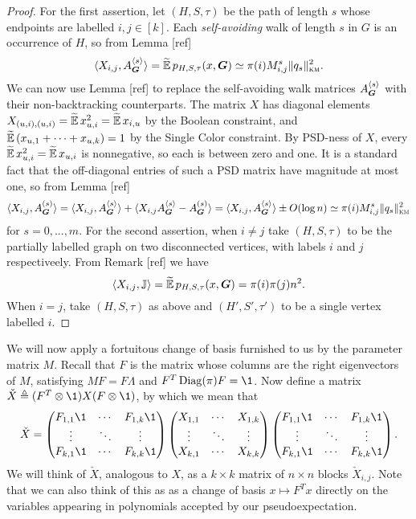 \begin{proof}
    For the first assertion, let $(H,S,\tau)$ be the path of length $s$ whose endpoints are labelled $i,j\in[k]$. Each \textit{self-avoiding} walk of length $s$ in $G$ is an occurrence of $H$, so from Lemma [ref]
    $$
        \langle X_{i,j},A^{\langle s \rangle}_{\boldsymbol{G}}\rangle = \widetilde{\operatorname*{\mathbb{E}}}\, p_{H,S,\tau}(x,\boldsymbol{G}) \simeq \pi(i)M_{i,j}^s \|q_s\|^2_{\textsc{km}}.
    $$
    We can now use Lemma [ref] to replace the self-avoiding walk matrices $A^{\langle s \rangle}_{\boldsymbol{G}}$ with their non-backtracking counterparts. The matrix $X$ has diagonal elements $X_{(u,i),(u,i)} = \widetilde{\operatorname*{\mathbb{E}}}\, x_{u,i}^2 = \widetilde{\operatorname*{\mathbb{E}}}\, x_{i,u}$ by the Boolean constraint, and $\widetilde{\operatorname*{\mathbb{E}}}\, (x_{u,1} + \cdots + x_{u,k}) = 1$ by the Single Color constraint. By PSD-ness of $X$, every $\widetilde{\operatorname*{\mathbb{E}}}\, x_{u,i}^2 = \widetilde{\operatorname*{\mathbb{E}}}\, x_{u,i}$ is nonnegative, so each is between zero and one. It is a standard fact that the off-diagonal entries of such a PSD matrix have magnitude at most one, so from Lemma [ref]
    $$
        \langle X_{i,j}, A^{(s)}_{\boldsymbol{G}} \rangle = \langle X_{i,j}, A^{\langle s \rangle}_{\boldsymbol{G}} \rangle + \langle X_{i,j} A^{\langle s \rangle}_{\boldsymbol{G}} - A^{(s)}_{\boldsymbol{G}}\rangle = \langle X_{i,j}, A^{\langle s \rangle}_{\boldsymbol{G}} \rangle \pm O(\log n) \simeq \pi(i)M^s_{i,j} \|q_s\|^2_{\textsc{km}}
    $$
    for $s = 0,...,m$. For the second assertion, when $i\neq j$ take $(H,S,\tau)$ to be the partially labelled graph on two disconnected vertices, with labels $i$ and $j$ respectiveely. From Remark [ref] we have
    $$
        \langle X_{i,j},\mathbb{J} \rangle = \widetilde{\operatorname*{\mathbb{E}}}\, p_{H,S,\tau}(x,\boldsymbol{G}) = \pi(i)\pi(j)n^2.
    $$
    When $i=j$, take $(H,S,\tau)$ as above and $(H',S',\tau')$ to be a single vertex labelled $i$.
\end{proof}

We will now apply a fortuitous change of basis furnished to us by the parameter matrix $M$. Recall that $F$ is the matrix whose columns are the right eigenvectors of $M$, satisfying $MF = F\Lambda$ and $F^T\Diag(\pi)F = \1$. Now define a matrix $\check X \triangleq (F^T \otimes \1) X (F\otimes \1)$, by which we mean that 
$$
    \check X = \begin{pmatrix} F_{1,1}\1 & \cdots & F_{1,k}\1 \\
    \vdots & \ddots & \vdots \\
    F_{k,1}\1 & \cdots & F_{k,k}\1 
    \end{pmatrix} 
    \begin{pmatrix} X_{1,1} & \cdots & X_{1,k} \\
    \vdots & \ddots & \vdots \\
    X_{k,1} & \cdots & X_{k,k} 
    \end{pmatrix}
    \begin{pmatrix} F_{1,1}\1 & \cdots & F_{1,k}\1 \\
    \vdots & \ddots & \vdots \\
    F_{k,1}\1 & \cdots & F_{k,k}\1 
    \end{pmatrix}.
$$
We will think of $\check X$, analogous to $X$, as a $k\times k$ matrix of $n\times n$ blocks $\check X_{i,j}$. Note that we can also think of this as as a change of basis $x \mapsto F^T x$ directly on the variables appearing in polynomials accepted by our pseudoexpectation.

